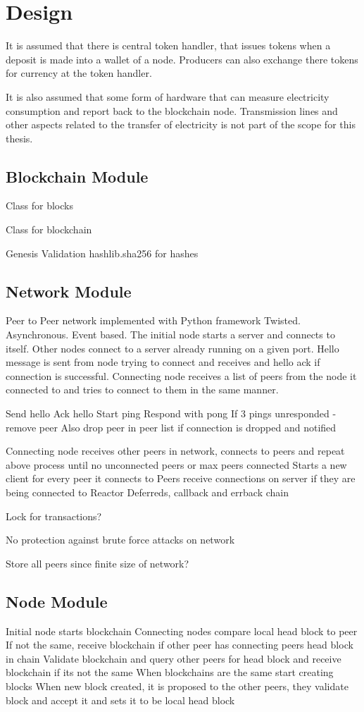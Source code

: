 \chapter{Design}
It is assumed that there is central token handler, that issues tokens when a deposit is made into a wallet of a node. Producers can also exchange there tokens for currency at the token handler.

It is also assumed that some form of hardware that can measure electricity consumption and report back to the blockchain node. Transmission lines and other aspects related to the transfer of electricity is not part of the scope for this thesis.

\section{Blockchain Module}
Class for blocks

Class for blockchain

Genesis
Validation
hashlib.sha256 for hashes 

\section{Network Module}
Peer to Peer network implemented with Python framework Twisted. Asynchronous. Event based. The initial node starts a server and connects to itself. Other nodes connect to a server already running on a given port. Hello message is sent from node trying to connect and receives and hello ack if connection is successful. Connecting node receives a list of peers from the node it connected to and tries to connect to them in the same manner.

Send hello
Ack hello
Start ping
Respond with pong
If 3 pings unresponded - remove peer
Also drop peer in peer list if connection is dropped and notified

Connecting node receives other peers in network, connects to peers and repeat above process until no unconnected peers or max peers connected
Starts a new client for every peer it connects to
Peers receive connections on server if they are being connected to
Reactor
Deferreds, callback and errback chain


Lock for transactions?

No protection against brute force attacks on network

Store all peers since finite size of network?
\section{Node Module}
Initial node starts blockchain
Connecting nodes compare local head block to peer
If not the same, receive blockchain if other peer has connecting peers head block in chain
Validate blockchain and query other peers for head block and receive blockchain if its not the same
When blockchains are the same start creating blocks
When new block created, it is proposed to the other peers, they validate block and accept it and sets it to be local head block 


